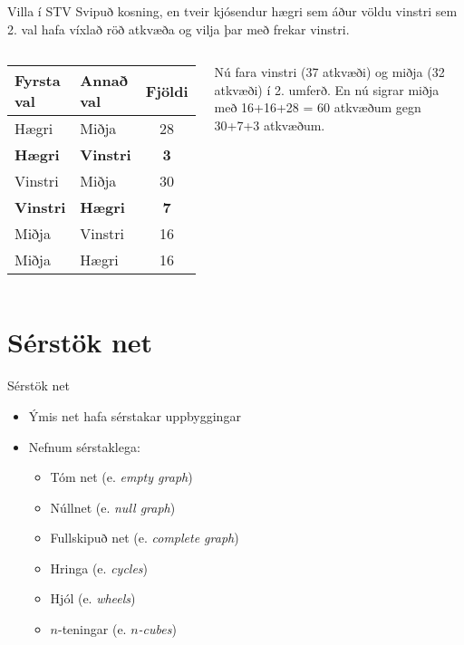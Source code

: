 \documentclass{beamer}
\begin{document}
\begin{frame}{Villa í STV}
    Svipuð kosning, en tveir kjósendur hægri sem áður völdu vinstri sem 2. val hafa víxlað röð atkvæða og vilja þar með frekar vinstri.
    \vspace{0.5cm}
    \begin{columns}
        \begin{center}
            \begin{tabular}{llc}
                \toprule
                Fyrsta val&Annað val&Fjöldi\\
                \midrule
                Hægri 	&Miðja& 	28\\
                \textbf{Hægri} 	&\textbf{Vinstri} &	\textbf{3}\\
                Vinstri 	&Miðja& 	30\\
                \textbf{Vinstri} 	&\textbf{Hægri} &	\textbf{7}\\
                Miðja 	&Vinstri &	16\\
                Miðja 	&Hægri &	16\\
                \bottomrule
            \end{tabular}
        \end{center}
        Nú fara vinstri (37 atkvæði) og miðja (32 atkvæði) í 2. umferð. En nú sigrar miðja með 16+16+28 = 60 atkvæðum gegn 30+7+3 atkvæðum.
    \end{columns}
\end{frame}

\section{Sérstök net}

\begin{frame}{Sérstök net}
\begin{itemize}
 \item Ýmis net hafa sérstakar uppbyggingar
 \item Nefnum sérstaklega:
 \begin{itemize}
  \item Tóm net (e. \emph{empty graph})
  \item Núllnet (e. \emph{null graph})
  \item Fullskipuð net (e. \emph{complete graph})
  \item Hringa (e. \emph{cycles})
  \item Hjól (e. \emph{wheels})
  \item $n$-teningar (e. \emph{$n$-cubes})
 \end{itemize}
\end{itemize}
\end{frame}
\end{document}
